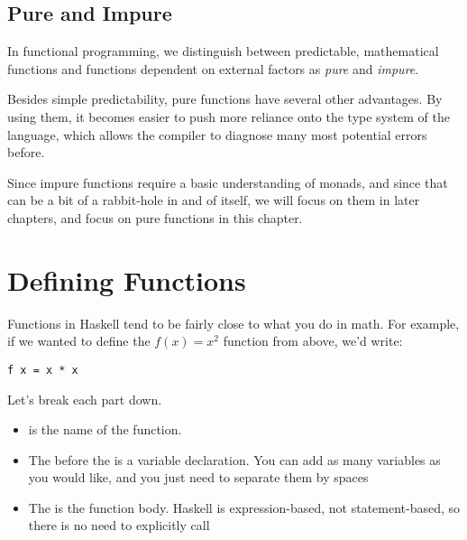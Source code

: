 \subsection{Pure and Impure} 
In functional programming, we distinguish between predictable, mathematical functions and functions dependent on external factors as \textit{pure} and \textit{impure}.  

Besides simple predictability, pure functions have several other advantages.  By using them, it becomes easier to push more reliance onto the type system of the language, which allows the compiler to diagnose many most potential errors before. 

Since impure functions require a basic understanding of monads, and since that can be a bit of a rabbit-hole in and of itself, we will focus on them in later chapters, and focus on pure functions in this chapter. 
\section {Defining Functions}

Functions in Haskell tend to be fairly close to what you do in math. For example, if we wanted to define the $ f\left( x \right) = x ^ 2 $ function from above, we'd write: 

\begin{verbatim}
f x = x * x
\end{verbatim}

Let's break each part down. 

\begin{itemize}
\item {} is the name of the function.  
\item The  before the \inlinecode{=} is a variable declaration. You can add as many variables as you would like, and you just need to separate them by spaces
\item The  is the function body. Haskell is expression-based, not statement-based, so there is no need to explicitly call 
\end {itemize}


